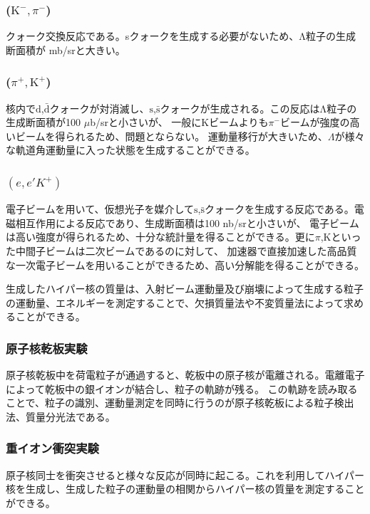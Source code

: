 \documentclass[a4paper,11pt,uplatex]{jsbook}
\begin{document}
\subsubsection{($\text{K}^-, \pi^-$)}
クォーク交換反応である。sクォークを生成する必要がないため、Λ粒子の生成断面積が mb/srと大きい。
\subsubsection{($\pi^+, \text{K}^+$)}
核内で$\text{d}$,$\bar{\text{d}}$クォークが対消滅し、$\text{s}$,$\bar{\text{s}}$クォークが生成される。この反応はΛ粒子の生成断面積が100 $\mu$b/srと小さいが、
一般にKビームよりも$\pi^-$ビームが強度の高いビームを得られるため、問題とならない。
運動量移行が大きいため、$\Lambda$が様々な軌道角運動量に入った状態を生成することができる。
\subsubsection{$(e,e'K^+)$}
電子ビームを用いて、仮想光子を媒介して$\text{s}$,$\bar{\text{s}}$クォークを生成する反応である。電磁相互作用による反応であり、生成断面積は100 nb/srと小さいが、
電子ビームは高い強度が得られるため、十分な統計量を得ることができる。更に$\pi$,Kといった中間子ビームは二次ビームであるのに対して、
加速器で直接加速した高品質な一次電子ビームを用いることができるため、高い分解能を得ることができる。


生成したハイパー核の質量は、入射ビーム運動量及び崩壊によって生成する粒子の運動量、エネルギーを測定することで、欠損質量法や不変質量法によって求めることができる。
\subsubsection{原子核乾板実験}
原子核乾板中を荷電粒子が通過すると、乾板中の原子核が電離される。電離電子によって乾板中の銀イオンが結合し、粒子の軌跡が残る。
この軌跡を読み取ることで、粒子の識別、運動量測定を同時に行うのが原子核乾板による粒子検出法、質量分光法である。
\subsubsection{重イオン衝突実験}
原子核同士を衝突させると様々な反応が同時に起こる。これを利用してハイパー核を生成し、生成した粒子の運動量の相関からハイパー核の質量を測定することができる。
\end{document}
